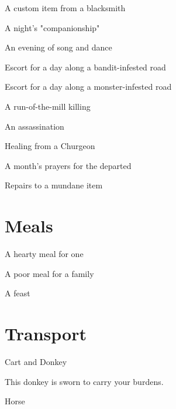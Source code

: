 A custom item from a blacksmith	 

       

A night's "companionship"	 

       

An evening of song and dance	 

       

Escort for a day along a bandit-infested road	 

       

Escort for a day along a monster-infested road	 

       

A run-of-the-mill killing	 

       

An assassination	 

       

Healing from a Churgeon	 

       

A month's prayers for the departed	 

       

Repairs to a mundane item	 

       
\section{Meals}   
       

A hearty meal for one	 

       

A poor meal for a family	 

       

A feast	 

       
\section{Transport}   
       

Cart and Donkey	 

       

This donkey is sworn to carry your burdens.

       

Horse	 

